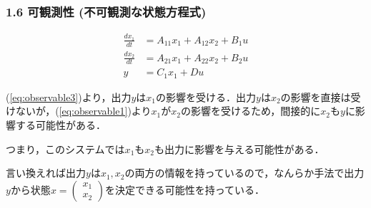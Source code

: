\documentclass[10pt]{beamer}
\begin{document}
\begin{frame}[t]
\frametitle{1.6 可観測性 (不可観測な状態方程式)}
\begin{align}
 \frac{dx_1}{dt} &= A_{11} x_1 + A_{12} x_2 + B_1 u
 \\
 \frac{dx_2}{dt} &= A_{21} x_1 + A_{22} x_2 + B_2 u
 \\
 y & = C_1 x_1 + Du

\end{align}

(\ref{eq:observable3})より，出力$y$は$x_1$の影響を受ける．出力$y$は$x_2$の影響を直接は受けないが，(\ref{eq:observable1})より$x_1$が$x_2$の影響を受けるため，間接的に$x_2$も$y$に影響する可能性がある．

つまり，このシステムでは$x_1$も$x_2$も出力に影響を与える可能性がある．

言い換えれば出力$y$は$x_1,x_2$の両方の情報を持っているので，なんらか手法で出力$y$から状態$x = \left(\begin{array}{c} {x}_1 \\ {x}_2 \end{array}\right)$を決定できる可能性を持っている．
\end{frame}
\end{document}
